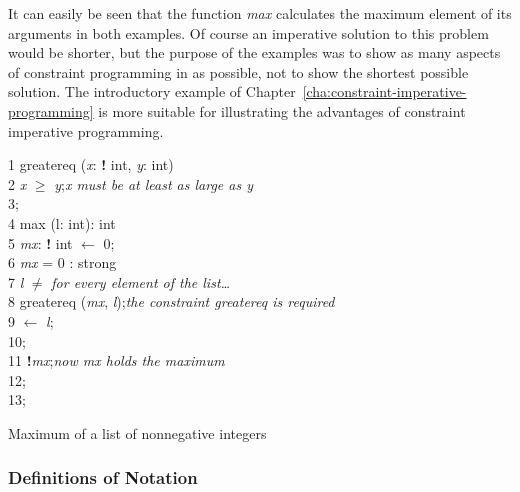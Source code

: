 It can easily be seen that the function {\em max} calculates the
maximum element of its arguments in both examples.  Of course an
imperative solution to this problem would be shorter, but the purpose
of the examples was to show as many aspects of constraint programming
in \turtle{} as possible, not to show the shortest possible solution.
The introductory example of
Chapter~\ref{cha:constraint-imperative-programming} is more suitable
for illustrating the advantages of constraint imperative programming.

\begin{Program}
\begin{ttlprog}
1\>\ttlConstraint{} greatereq ({\em x}: {\bf!} int, {\em y}: int)\\
2\>\>\ttlRequire{} {\em x} $\geq$ {\em y};\`{\em {\em x} must be at least as large as {\em y}}\\
3\>\ttlEnd{};\\
4\>\ttlFun{} max ({\em }l: \ttlList{} \ttlOf{} int): int\\
5\>\>\ttlVar{} {\em mx}: {\bf!} int $\leftarrow$ \ttlVar{} 0;\\
6\>\>\ttlRequire{} {\em mx} = 0 : strong \ttlIn{}\\
7\>\>\>\ttlWhile{} {\em l} $\neq$ \ttlNull{} \ttlDo{}\`{\em for every element of the list\dots}\\
8\>\>\>\>\ttlRequire{} greatereq ({\em mx}, \ttlHd{} {\em l});\`{\em the constraint {\em greatereq} is required}\\
9\>\>\> $\leftarrow$ \ttlTl{} {\em l};\\
10\>\>\>\ttlEnd{};\\
11\>\>\>\ttlReturn{} {\bf!}{\em mx};\`{\em now {\em mx} holds the maximum}\\
12\>\>\ttlEnd{};\\
13\>\ttlEnd{};
\end{ttlprog}
\caption{Maximum of a list of nonnegative integers}
\label{prog:maximum}
\end{Program}


\subsubsection{Definitions of Notation}
\label{sec:definitions}

